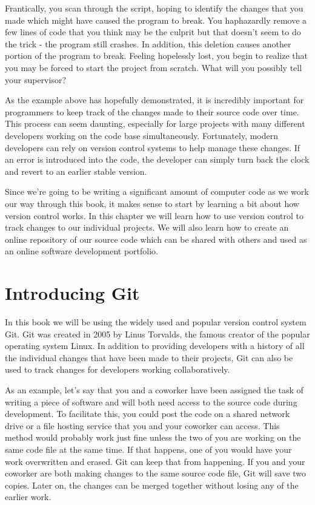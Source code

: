 \documentclass{book}
\begin{document}
Frantically, you scan through the script, hoping to identify the changes that you made which might have caused the program to break. You haphazardly remove a few lines of code that you think may be the culprit but that doesn't seem to do the trick - the program still crashes. In addition, this deletion causes another portion of the program to break. Feeling hopelessly lost, you begin to realize that you may be forced to start the project from scratch. What will you possibly tell your supervisor?

As the example above has hopefully demonstrated, it is incredibly important for programmers to keep track of the changes made to their source code over time. This process can seem daunting, especially for large projects with many different developers working on the code base simultaneously. Fortunately, modern developers can rely on version control systems to help manage these changes. If an error is introduced into the code, the developer can simply turn back the clock and revert to an earlier stable version. 

Since we're going to be writing a significant amount of computer code as we work our way through this book, it makes sense to start by learning a bit about how version control works. In this chapter we will learn how to use version control to track changes to our individual projects. We will also learn how to create an online repository of our source code which can be shared with others and used as an online software development portfolio.

\section{Introducing Git}

In this book we will be using the widely used and popular version control system Git\texttrademark. Git was created in 2005 by Linus Torvalds, the famous creator of the popular operating system Linux. In addition to providing developers with a history of all the individual changes that have been made to their projects, Git can also be used to track changes for developers working collaboratively. 

As an example, let's say that you and a coworker have been assigned the task of writing a piece of software and will both need access to the source code during development. To facilitate this, you could post the code on a shared network drive or a file hosting service that you and your coworker can access. This method would probably work just fine unless the two of you are working on the same code file at the same time. If that happens, one of you would have your work overwritten and erased. Git can keep that from happening. If you and your coworker are both making changes to the same source code file, Git will save two copies. Later on, the changes can be merged together without losing any of the earlier work. 
\end{document}
